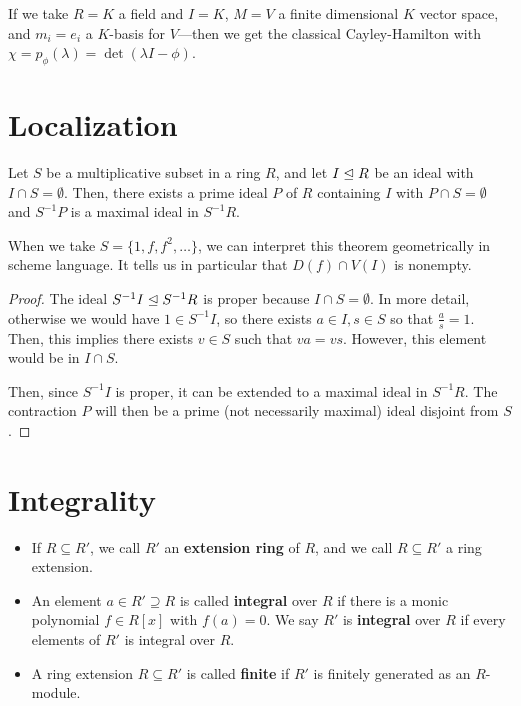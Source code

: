 \documentclass[12pt]{article}
\begin{document}
\begin{rmk}
    If we take $R=K$ a field and $I=K$, $M=V$ a finite dimensional $K$ vector space, and $m_i=e_i$ a $K$-basis for $V$---then we get the classical Cayley-Hamilton with $\chi = p_\phi(\lambda) = \det(\lambda I - \phi)$.
\end{rmk}

\section{Localization}

\begin{prop}\label{getpoint}
    Let $S$ be a multiplicative subset in a ring $R$, and let $I\trianglelefteq R$ be an ideal with $I\cap S = \emptyset$. Then, there exists a prime ideal $P$ of $R$ containing $I$ with $P\cap S = \emptyset$ and $S^{-1} P$ is a maximal ideal in $S^{-1} R$.
\end{prop}

When we take $S=\{1,f,f^2,\dots\}$, we can interpret this theorem geometrically in scheme language. It tells us in particular that $D(f)\cap V(I)$ is nonempty.

\begin{proof}
    The ideal $S^{-1} I \trianglelefteq S^{-1} R$ is proper because $I\cap S = \emptyset$. In more detail, otherwise we would have $1\in S^{-1} I$, so there exists $a\in I, s\in S$ so that $\frac{a}{s}=1$. Then, this implies there exists $v\in S$ such that $va=vs$. However, this element would be in $I\cap S$.
    
    Then, since $S^{-1} I$ is proper, it can be extended to a maximal ideal in $S^{-1} R$. The contraction $P$ will then be a prime (not necessarily maximal) ideal disjoint from $S$.
\end{proof}

\section{Integrality}

\begin{defn}\;
    \begin{itemize}
        \item If $R\subseteq R'$, we call $R'$ an \textbf{extension ring} of $R$, and we call $R\subseteq R'$ a ring extension.
        \item An element $a\in R'\supseteq R$ is called \textbf{integral} over $R$ if there is a monic polynomial $f\in R[x]$ with $f(a)=0$. We say $R'$ is \textbf{integral} over $R$ if every elements of $R'$ is integral over $R$.
        \item A ring extension $R\subseteq R'$ is called \textbf{finite} if $R'$ is finitely generated as an $R$-module.
    \end{itemize}
\end{defn}
\end{document}
